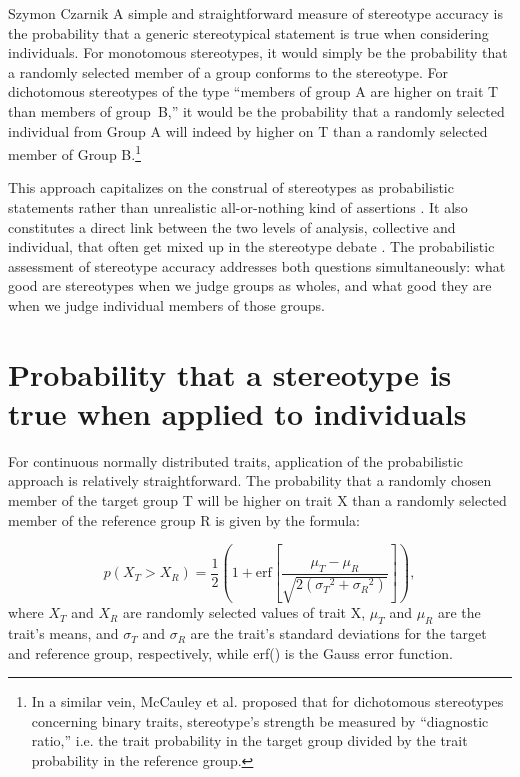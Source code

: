 \begin{artengenv}{Szymon Czarnik}
\enlargethispage{\baselineskip}
A simple and straightforward measure of stereotype accuracy is the probability that a generic stereotypical statement is true when considering individuals. For monotomous stereotypes, it would simply be the probability that a randomly selected member of a group conforms to the stereotype. For dichotomous stereotypes of the type ``members of group A are higher on trait T than members of group~B,'' it would be the probability that a randomly selected individual from Group A will indeed by higher on T than a randomly selected member of Group B.\footnote{In a similar vein, McCauley et al.
\parencite*[][]{mccauley_stereotyping_1980} %
 proposed that for dichotomous stereotypes concerning binary traits, stereotype's strength be measured by ``diagnostic ratio,'' i.e. the trait probability in the target group divided by the trait probability in the reference group. }

This approach capitalizes on the construal of stereotypes as probabilistic statements rather than unrealistic all-or-nothing kind of assertions
\parencite[][]{schneider_psychology_2005}. %
 It also constitutes a direct link between the two levels of analysis, collective and individual, that often get mixed up in the stereotype debate 
\parencite[][]{jussim_unbearable_2009}. %
 The probabilistic assessment of stereotype accuracy addresses both questions simultaneously: what good are stereotypes when we judge groups as wholes, and what good they are when we judge individual members of those groups.

\section{Probability that a stereotype is true when applied to individuals}
For continuous normally distributed traits, application of the probabilistic approach is relatively straightforward. The probability that a randomly chosen member of the target group T will be higher on trait X than a randomly selected member of the reference group R is given by the formula:

\[p\left( X_{T} > X_{R} \right) = \frac{1}{2}\left( 1 + \text{erf}\left\lbrack \frac{\mu_{T} - \mu_{R}}{\sqrt{2\left( {\sigma_{T}}^{2} + {\sigma_{R}}^{2} \right)}} \right\rbrack \right),\]
where \(X_{T}\) and \(X_{R}\) are randomly selected values of trait X,
\(\mu_{T}\) and \(\mu_{R}\) are the trait's means, and \(\sigma_{T}\)
and \(\sigma_{R}\) are the trait's standard deviations for the target
and reference group, respectively, while erf() is the Gauss error
function.


\end{artengenv}
